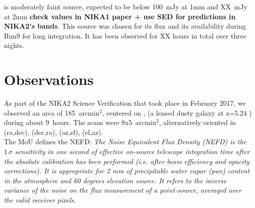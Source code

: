 


\hls is moderately faint source, expected to be below 100~mJy at 1mm and
XX~mJy at 2mm {\bf check values in NIKA1 paper + use SED for predictions in
  NIKA2's bands}. This source was chosen for its flux and its availability during
Run9 for long integration. It has been observed for XX hours in total over three
nights.


\section{Observations}

As part of the NIKA2 Science Verification that took place in February 2017, we
observed an area of 185~arcmin$^2$, centered on \hls, (a lensed dusty galaxy at
z=5.24 \cite{combes2012}) during about 9~hours. The scans were 8x5~arcmin$^2$,
alternatively oriented in (ra,dec), (dec,ra), (az,el), (el,az).\\

The MoU defines the NEFD:  \emph{The Noise Equivalent Flux Density (NEFD)
  is the $1\,\sigma$ sensitivity in one second of effective on-source telescope
  integration time after the absolute calibration has been performed (i.e. after
  beam efficiency and opacity corrections). It is appropriate for 2 mm of
  precipitable water vapor (pwv) content in the atmosphere and 60 degrees
  elevation source. It refers to the inverse variance of the noise on the flux
  measurement of a point-source, averaged over the valid receiver pixels}.

